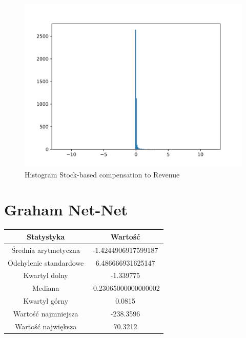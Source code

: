 \documentclass{article}
\begin{document}
\begin{figure}[h!]
    \includegraphics[width=\linewidth]{variables/Stock-based compensation to Revenue.png}
    \caption{Histogram Stock-based compensation to Revenue }
\end{figure}\section{ Graham Net-Net }

\begin{center}
    \begin{tabular}{|c | c|} 
    \hline
    Statystyka & Wartość \\
    \hline\hline
    Średnia arytmetyczna & -1.4244906917599187 \\ 
    \hline
    Odchylenie standardowe & 6.486666931625147 \\
    \hline
    Kwartyl dolny & -1.339775 \\
    \hline
    Mediana & -0.23065000000000002 \\
    \hline
    Kwartyl górny & 0.0815 \\
    \hline
    Wartość najmniejsza & -238.3596 \\
    \hline
    Wartość największa & 70.3212 \\
    \hline
   \end{tabular}
\end{center}
\end{document}
